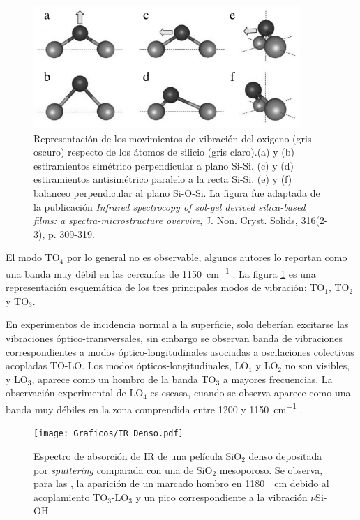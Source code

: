 		 		 \begin{figure}[!ht]
						\begin{center}
						\includegraphics[width=0.90\textwidth]{Imagenes/modos-infra.jpg}
						\caption[Modos de vibración Si-O-Si]{Representación de los movimientos de vibración del oxigeno (gris oscuro) respecto de los átomos de silicio (gris claro).(a) y (b) estiramientos simétrico perpendicular a plano Si-Si. (c) y (d) estiramientos antisimétrico paralelo a la recta Si-Si. (e) y (f) balanceo perpendicular al plano Si-O-Si. La figura fue adaptada de la publicación \textit{Infrared spectrocopy of sol-gel derived silica-based films: a spectra-microstructure overvire}, J. Non. Cryst. Solids, 316(2-3), p. 309-319. }
						\label{fig:modos-ir}
						\end{center}
						\end{figure}

		 El modo TO$_4$ por lo general no es observable, algunos autores lo reportan como una banda muy débil en las cercanías de \SI{1150}{\cm^{-1}} \cite{Pai1986,Grosse1986}. La figura \ref{fig:modos-ir} es una representación esquemática de los tres principales modos de vibración: TO$_1$, TO$_2$ y TO$_3$.

		 En experimentos de incidencia normal a la superficie, solo deberían excitarse las vibraciones óptico-transversales, sin embargo se observan banda de vibraciones correspondientes a modos óptico-longitudinales asociadas a oscilaciones colectivas acopladas TO-LO\cite{Pai1986,Grosse1986,Innocenzi2003}. Los modos ópticos-longitudinales, LO$_1$ y LO$_2$ no son visibles, y LO$_3$, aparece como un hombro de la banda TO$_3$ a mayores frecuencias. La observación experimental de LO$_4$ es escasa, cuando se observa aparece como una banda muy débiles en la zona comprendida entre 1200 y \SI{1150}{\cm^{-1}} \cite{Pai1986,Grosse1986}.
				 
				 \begin{figure}[!b]
						\begin{center}
						\texttt{[image: Graficos/IR\_Denso.pdf]}
						\caption[FTIR SiO$_2$ denso y SiO$_2$ mesoporoso.]{Espectro de absorción de IR de una película SiO$_2$ denso depositada por \textit{sputtering }comparada con una de SiO$_2$ mesoporoso. Se observa, para las \pdm, la aparición de un marcado hombro en \SI{1180}{\per\cm} debido al acoplamiento TO$_3$-LO$_3$ y un pico correspondiente a la vibración $\nu$Si-OH.}
						\label{fig:IR-denso}
						\end{center}
						\end{figure}

